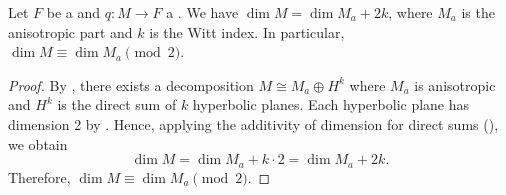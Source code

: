 \begin{corollary} \label{corollary:dimension_formula_for_nondegenerate_quadratic_forms_on_vector_spcaes}
Let $F$ be a  and $q: M \to F$ a  .
We have $\dim M = \dim M_a + 2k$, where $M_a$ is the anisotropic part and $k$ is the Witt index. In particular, $\dim M \equiv \dim M_a \pmod{2}$.
\end{corollary}
\begin{proof}
    By , there exists a decomposition $M \cong M_a \oplus H^k$ where $M_a$ is anisotropic and $H^k$ is the direct sum of $k$ hyperbolic planes. Each hyperbolic plane has dimension 2 by . Hence, applying the additivity of dimension for direct sums (), we obtain
    $$\dim M = \dim M_a + k \cdot 2 = \dim M_a + 2k.$$
    Therefore, $\dim M \equiv \dim M_a \pmod{2}$.
\end{proof}